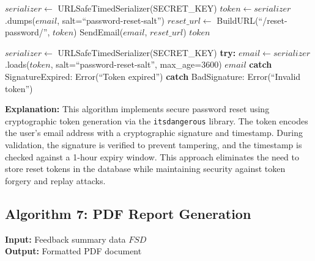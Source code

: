 \begin{algorithm}[H]
\caption{Token-Based Password Reset}
\begin{algorithmic}[1]

    \State $serializer \gets$ URLSafeTimedSerializer(SECRET\_KEY)
    \State $token \gets serializer$.dumps($email$, salt=``password-reset-salt'')
    \State $reset\_url \gets$ BuildURL(``/reset-password/'', $token$)
    \State SendEmail($email$, $reset\_url$)
    \State \Return $token$
\EndFunction

    \State $serializer \gets$ URLSafeTimedSerializer(SECRET\_KEY)
    \State \textbf{try:}
    \State \hspace{1em} $email \gets serializer$.loads($token$, salt=``password-reset-salt'', max\_age=3600)
    \State \hspace{1em} \Return $email$ 
    \State \textbf{catch} SignatureExpired:
    \State \hspace{1em} \Return Error(``Token expired'')
    \State \textbf{catch} BadSignature:
    \State \hspace{1em} \Return Error(``Invalid token'')
\EndFunction

\end{algorithmic}
\end{algorithm}

\textbf{Explanation:}
This algorithm implements secure password reset using cryptographic token generation via the \texttt{itsdangerous} library. The token encodes the user's email address with a cryptographic signature and timestamp. During validation, the signature is verified to prevent tampering, and the timestamp is checked against a 1-hour expiry window. This approach eliminates the need to store reset tokens in the database while maintaining security against token forgery and replay attacks.

\subsection{Algorithm 7: PDF Report Generation}

\textbf{Input:} Feedback summary data $FSD$ \\
\textbf{Output:} Formatted PDF document

